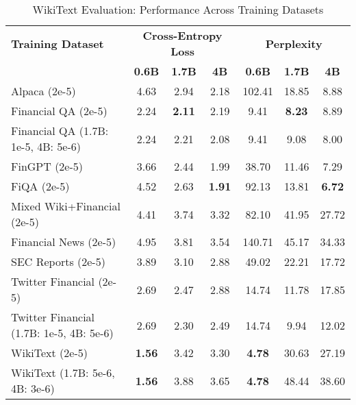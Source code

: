 
\begin{table}[htbp]
\centering
\caption[WikiText Evaluation: Cross-Dataset Performance]{WikiText Evaluation: Performance Across Training Datasets}
\label{tab:cross_wikitext}
\begin{tabular}{l|ccc|ccc}
\hline
\textbf{Training Dataset} & \multicolumn{3}{c|}{\textbf{Cross-Entropy Loss}} & \multicolumn{3}{c}{\textbf{Perplexity}} \\
\cline{2-4} \cline{5-7}
  & \textbf{0.6B} & \textbf{1.7B} & \textbf{4B} & \textbf{0.6B} & \textbf{1.7B} & \textbf{4B} \\
Alpaca (2e-5) & 4.63 & 2.94 & 2.18 & 102.41 & 18.85 & 8.88  \\
Financial QA (2e-5) & 2.24 & \textbf{2.11} & 2.19 & 9.41 & \textbf{8.23} & 8.89  \\
Financial QA (1.7B: 1e-5, 4B: 5e-6) & 2.24 & 2.21 & 2.08 & 9.41 & 9.08 & 8.00  \\
FinGPT (2e-5) & 3.66 & 2.44 & 1.99 & 38.70 & 11.46 & 7.29  \\
FiQA (2e-5) & 4.52 & 2.63 & \textbf{1.91} & 92.13 & 13.81 & \textbf{6.72}  \\
Mixed Wiki+Financial (2e-5) & 4.41 & 3.74 & 3.32 & 82.10 & 41.95 & 27.72  \\
Financial News (2e-5) & 4.95 & 3.81 & 3.54 & 140.71 & 45.17 & 34.33  \\
SEC Reports (2e-5) & 3.89 & 3.10 & 2.88 & 49.02 & 22.21 & 17.72  \\
Twitter Financial (2e-5) & 2.69 & 2.47 & 2.88 & 14.74 & 11.78 & 17.85  \\
Twitter Financial (1.7B: 1e-5, 4B: 5e-6) & 2.69 & 2.30 & 2.49 & 14.74 & 9.94 & 12.02  \\
WikiText (2e-5) & \textbf{1.56} & 3.42 & 3.30 & \textbf{4.78} & 30.63 & 27.19  \\
WikiText (1.7B: 5e-6, 4B: 3e-6) & \textbf{1.56} & 3.88 & 3.65 & \textbf{4.78} & 48.44 & 38.60  \\
\hline
\end{tabular}
\end{table}

